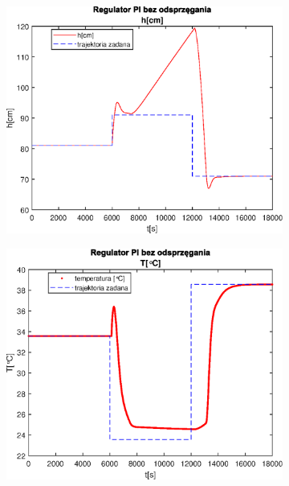 \begin{figure}[h!]
   \centering
   \begin{subfigure}[b]{0.4\textwidth}
      \includegraphics[width=1\linewidth]{img/PI/noDecoupler/noDisturbance/PINoDecouplerH1Linfalse.eps}
      \caption{}
      \label{fig:fig:PINodDecoupler1Linfalse1}
   \end{subfigure}
       
   \begin{subfigure}[b]{0.4\textwidth}
      \includegraphics[width=1\linewidth]{img/PI/noDecoupler/noDisturbance/PINoDecouplerT1Linfalse.eps}
      \caption{}
      \label{fig:fig:PINodDecoupler1Linfalse2}
   \end{subfigure}
       

\end{figure}
